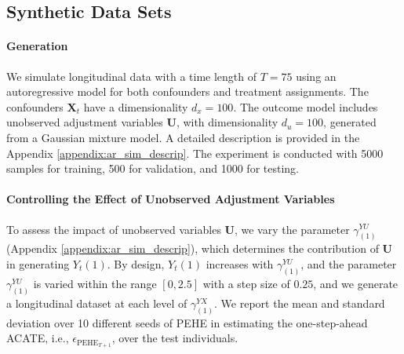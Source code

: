 \documentclass[10pt]{article} %
\begin{document}
\subsection{Synthetic Data Sets}
\paragraph{Generation} We simulate longitudinal data with a time length of \(T=75\) using an autoregressive model for both confounders and treatment assignments. The confounders \(\mathbf{X}_t\) have a dimensionality \(d_x = 100\). The outcome model includes unobserved adjustment variables \(\mathbf{U}\), with dimensionality \(d_u = 100\), generated from a Gaussian mixture model. A detailed description is provided in the Appendix \ref{appendix:ar_sim_descrip}. The experiment is conducted with 5000 samples for training, 500 for validation, and 1000 for testing.

\paragraph{Controlling the Effect of Unobserved Adjustment Variables}  To assess the impact of unobserved variables \(\mathbf{U}\), we vary the parameter \(\gamma_{(1)}^{YU}\) (Appendix \ref{appendix:ar_sim_descrip}), which determines the contribution of \(\mathbf{U}\) in generating \(Y_t(1)\). By design, \(Y_t(1)\) increases with \(\gamma_{(1)}^{YU}\), and the parameter \(\gamma_{(1)}^{YU}\) is varied within the range \([0, 2.5]\) with a step size of \(0.25\), and we generate a longitudinal dataset at each level of \(\gamma_{(1)}^{YX}\). We report the mean and standard deviation over 10 different seeds of PEHE in estimating the one-step-ahead ACATE, i.e., \(\epsilon_{\mathrm{PEHE}_{T+1}}\), over the test individuals. 
\end{document}
